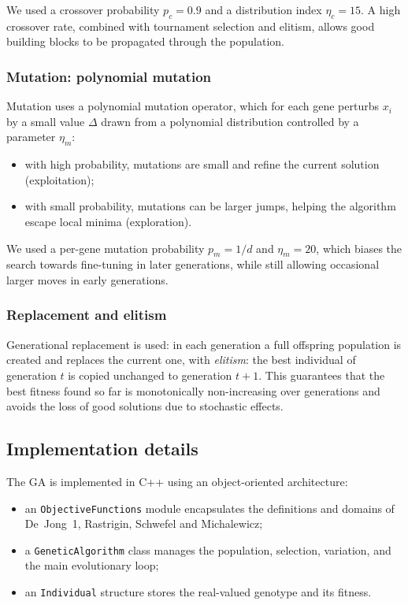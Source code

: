 \documentclass[a4paper,11pt]{article}
\begin{document}
We used a crossover probability $p_c = 0.9$ and a distribution index
$\eta_c = 15$. A high crossover rate, combined with tournament selection
and elitism, allows good building blocks to be propagated through the
population.

\subsubsection{Mutation: polynomial mutation}

Mutation uses a polynomial mutation operator, which for each gene perturbs
$x_i$ by a small value $\Delta$ drawn from a polynomial distribution
controlled by a parameter $\eta_m$:
\begin{itemize}
  \item with high probability, mutations are small and refine the current
        solution (exploitation);
  \item with small probability, mutations can be larger jumps, helping the
        algorithm escape local minima (exploration).
\end{itemize}

We used a per-gene mutation probability $p_m = 1/d$ and $\eta_m = 20$,
which biases the search towards fine-tuning in later generations, while
still allowing occasional larger moves in early generations.

\subsubsection{Replacement and elitism}

Generational replacement is used: in each generation a full offspring population
is created and replaces the current one, with \emph{elitism}:
the best individual of generation $t$ is copied unchanged to generation $t+1$.
This guarantees that the best fitness found so far is monotonically non-increasing
over generations and avoids the loss of good solutions due to stochastic effects.

\subsection{Implementation details}

The GA is implemented in C++ using an object-oriented architecture:
\begin{itemize}
  \item an \texttt{ObjectiveFunctions} module encapsulates the definitions and
        domains of De~Jong~1, Rastrigin, Schwefel and Michalewicz;
  \item a \texttt{GeneticAlgorithm} class manages the population, selection,
        variation, and the main evolutionary loop;
  \item an \texttt{Individual} structure stores the real-valued genotype and
        its fitness.
\end{itemize}
\end{document}
